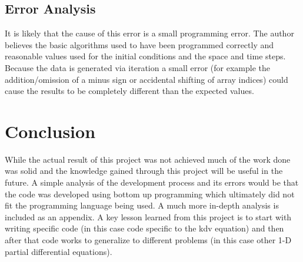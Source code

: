 \documentclass{article}
\begin{document}
\subsection{Error Analysis}
It is likely that the cause of this error is a small programming error. The
author believes the basic algorithms used to have been programmed correctly and
reasonable values used for the initial conditions and the space and time
steps. Because the data is generated via iteration a small error (for example
the addition/omission of a minus sign or accidental shifting of array indices)
could cause the results to be completely different than the expected values.
\section{Conclusion}
While the actual result of this project was not achieved much of the
work done was solid and the knowledge gained through this project will
be useful in the future. A simple analysis of the development process
and its errors would be that the code was developed using bottom up
programming which ultimately did not fit the programming language
being used. A much more in-depth analysis is included as an
appendix. A key lesson learned from this project is to start with
writing specific code (in this case code specific to the kdv equation)
and then after that code works to generalize to different problems (in
this case other 1-D partial differential equations).
\pagebreak
\end{document}
